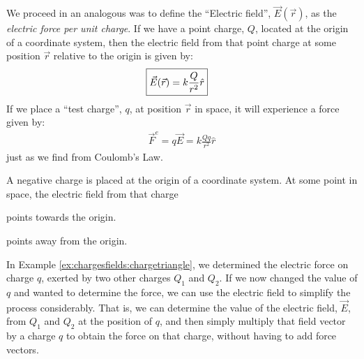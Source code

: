 We proceed in an analogous was to define the ``Electric field'', $\vec E(\vec r)$, as the \textit{electric force per unit charge}. If we have a point charge, $Q$, located at the origin of a coordinate system, then the electric field from that point charge at some position $\vec r$ relative to the origin is given by:
\begin{align*}
\Aboxed{\vec E(\vec r) = k\frac{Q}{r^2}\hat r}
\end{align*}
If we place a ``test charge'', $q$, at position $\vec r$ in space, it will experience a force given by:
\begin{align*}
\vec F^e=q\vec E=k\frac{Qq}{r^2}\hat r
\end{align*}
just as we find from Coulomb's Law. 
\begin{checkpoint}\label{cp:chargesfields:edirection}
\begin{MCquestion}{A negative charge is placed at the origin of a coordinate system. At some point in space, the electric field from that charge}
\item points towards the origin. \correct
\item points away from the origin.
\end{MCquestion}
\end{checkpoint}
In Example \ref{ex:chargesfields:chargetriangle}, we determined the electric force on charge $q$, exerted by two other charges $Q_1$ and $Q_2$. If we now changed the value of $q$ and wanted to determine the force, we can use the electric field to simplify the process considerably. That is, we can determine the value of the electric field, $\vec E$, from $Q_1$ and $Q_2$ at the position of $q$, and then simply multiply that field vector by a charge $q$ to obtain the force on that charge, without having to add force vectors.
